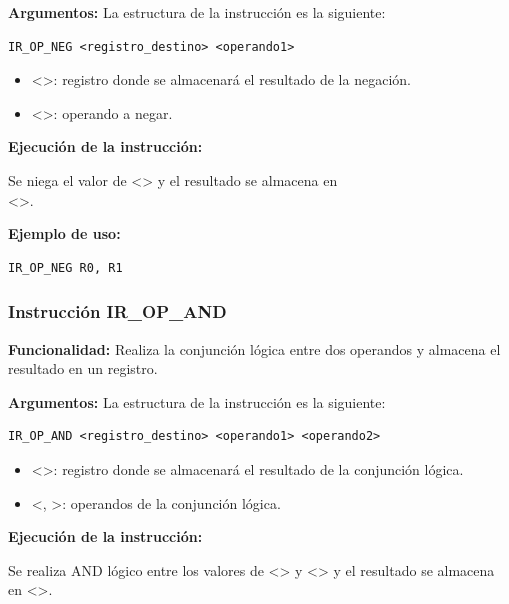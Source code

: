 \noindent
\textbf{Argumentos:} La estructura de la instrucción es la siguiente:
\begin{verbatim}
IR_OP_NEG <registro_destino> <operando1>
\end{verbatim}
\begin{itemize}
    \item <>: registro donde se almacenará el resultado de la negación.
    \item <>: operando a negar.
\end{itemize}

\noindent
\textbf{Ejecución de la instrucción:}
\vspace{0.3cm}

\noindent
Se niega el valor de <> y el resultado se almacena en \\
<>.
\vspace{0.3cm}

\noindent
\textbf{Ejemplo de uso:}
\begin{verbatim}
IR_OP_NEG R0, R1
\end{verbatim}

\subsubsection{Instrucción IR\_OP\_AND}\label{subsubsec:IR_OP_AND}
\noindent
\textbf{Funcionalidad:} Realiza la conjunción lógica entre dos operandos y almacena el resultado en un registro.

\noindent
\textbf{Argumentos:} La estructura de la instrucción es la siguiente:
\begin{verbatim}
IR_OP_AND <registro_destino> <operando1> <operando2>
\end{verbatim}
\begin{itemize}
    \item <>: registro donde se almacenará el resultado de la conjunción lógica.
    \item <, >: operandos de la conjunción lógica.
\end{itemize}

\noindent
\textbf{Ejecución de la instrucción:}
\vspace{0.3cm}

\noindent
Se realiza AND lógico entre los valores de <> y <> y el resultado se almacena en <>.
\vspace{0.3cm}

